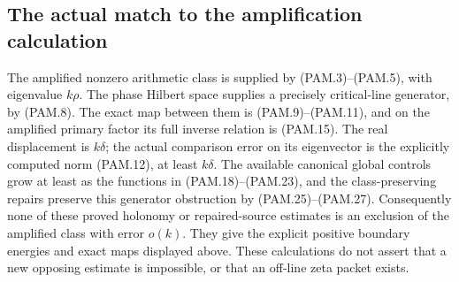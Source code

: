 \subsection{The actual match to the amplification calculation}

The amplified nonzero arithmetic class is supplied by
(PAM.3)--(PAM.5), with eigenvalue \(k\rho\).
The phase Hilbert space supplies a precisely critical-line
generator, by (PAM.8). The exact map between them is
(PAM.9)--(PAM.11), and on the amplified primary factor its full
inverse relation is (PAM.15).
The real displacement is \(k\delta\); the actual comparison
error on its eigenvector is the explicitly computed norm
(PAM.12), at least \(k\delta\).
The available canonical global controls grow at least as the
functions in (PAM.18)--(PAM.23), and the class-preserving
repairs preserve this generator obstruction by
(PAM.25)--(PAM.27).
Consequently none of these proved holonomy or repaired-source
estimates is an exclusion of the amplified class with error
\(o(k)\). They give the explicit positive boundary energies
and exact maps displayed above. These calculations do not
assert that a new opposing estimate is impossible, or that
an off-line zeta packet exists.
